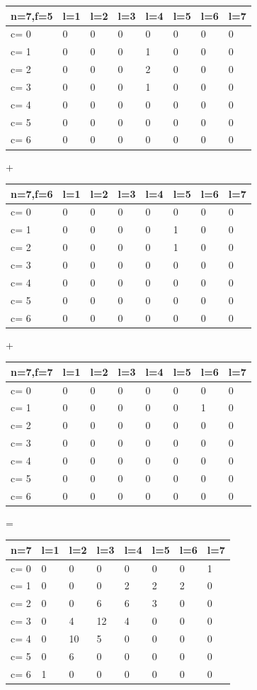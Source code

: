 {\begin{tabular}{l | l l l l l l l}
\hline
n=7,f=5&l=1&l=2&l=3&l=4&l=5&l=6&l=7\\
\hline
c= 0& 0& 0& 0& 0& 0& 0& 0\\
c= 1& 0& 0& 0& 1& 0& 0& 0\\
c= 2& 0& 0& 0& 2& 0& 0& 0\\
c= 3& 0& 0& 0& 1& 0& 0& 0\\
c= 4& 0& 0& 0& 0& 0& 0& 0\\
c= 5& 0& 0& 0& 0& 0& 0& 0\\
c= 6& 0& 0& 0& 0& 0& 0& 0\\
\hline
\end{tabular}
+
\begin{tabular}{l | l l l l l l l}
\hline
n=7,f=6&l=1&l=2&l=3&l=4&l=5&l=6&l=7\\
\hline
c= 0& 0& 0& 0& 0& 0& 0& 0\\
c= 1& 0& 0& 0& 0& 1& 0& 0\\
c= 2& 0& 0& 0& 0& 1& 0& 0\\
c= 3& 0& 0& 0& 0& 0& 0& 0\\
c= 4& 0& 0& 0& 0& 0& 0& 0\\
c= 5& 0& 0& 0& 0& 0& 0& 0\\
c= 6& 0& 0& 0& 0& 0& 0& 0\\
\hline
\end{tabular}
+

\begin{tabular}{l | l l l l l l l}
\hline
n=7,f=7&l=1&l=2&l=3&l=4&l=5&l=6&l=7\\
\hline
c= 0& 0& 0& 0& 0& 0& 0& 0\\
c= 1& 0& 0& 0& 0& 0& 1& 0\\
c= 2& 0& 0& 0& 0& 0& 0& 0\\
c= 3& 0& 0& 0& 0& 0& 0& 0\\
c= 4& 0& 0& 0& 0& 0& 0& 0\\
c= 5& 0& 0& 0& 0& 0& 0& 0\\
c= 6& 0& 0& 0& 0& 0& 0& 0\\
\hline
\end{tabular}
=
\begin{tabular}{l | l l l l l l l}
\hline
n=7&l=1&l=2&l=3&l=4&l=5&l=6&l=7\\
\hline
c= 0& 0& 0& 0& 0& 0& 0& 1\\
c= 1& 0& 0& 0& 2& 2& 2& 0\\
c= 2& 0& 0& 6& 6& 3& 0& 0\\
c= 3& 0& 4& 12& 4& 0& 0& 0\\
c= 4& 0& 10& 5& 0& 0& 0& 0\\

c= 5& 0& 6& 0& 0& 0& 0& 0\\
c= 6& 1& 0& 0& 0& 0& 0& 0\\
\hline
\end{tabular}
}


